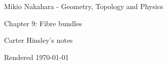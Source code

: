 \documentclass[a4paper]{article}
\begin{document}
\begin{center}
\LARGE{Mikio Nakahara - Geometry, Topology and Physics}

\Large{Chapter 9: Fibre bundles}

\large{Carter Hinsley's notes}

Rendered \today
\end{center}
\end{document}

